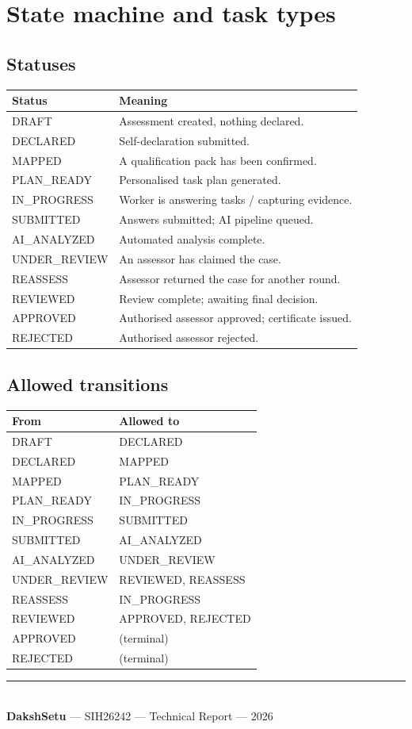 \documentclass[11pt,a4paper]{article}
\begin{document}
\newpage
\section{State machine and task types}
\subsection{Statuses}
\begin{center}
\small
\begin{tabular}{L{3.4cm}L{11.5cm}}
\toprule
\textbf{Status} & \textbf{Meaning} \\
\midrule
DRAFT & Assessment created, nothing declared. \\
DECLARED & Self-declaration submitted. \\
MAPPED & A qualification pack has been confirmed. \\
PLAN\_READY & Personalised task plan generated. \\
IN\_PROGRESS & Worker is answering tasks / capturing evidence. \\
SUBMITTED & Answers submitted; AI pipeline queued. \\
AI\_ANALYZED & Automated analysis complete. \\
UNDER\_REVIEW & An assessor has claimed the case. \\
REASSESS & Assessor returned the case for another round. \\
REVIEWED & Review complete; awaiting final decision. \\
APPROVED & Authorised assessor approved; certificate issued. \\
REJECTED & Authorised assessor rejected. \\
\bottomrule
\end{tabular}
\end{center}

\subsection{Allowed transitions}
\begin{center}
\small
\begin{tabular}{L{3.4cm}L{11.5cm}}
\toprule
\textbf{From} & \textbf{Allowed to} \\
\midrule
DRAFT & DECLARED \\
DECLARED & MAPPED \\
MAPPED & PLAN\_READY \\
PLAN\_READY & IN\_PROGRESS \\
IN\_PROGRESS & SUBMITTED \\
SUBMITTED & AI\_ANALYZED \\
AI\_ANALYZED & UNDER\_REVIEW \\
UNDER\_REVIEW & REVIEWED, REASSESS \\
REASSESS & IN\_PROGRESS \\
REVIEWED & APPROVED, REJECTED \\
APPROVED & (terminal) \\
REJECTED & (terminal) \\
\bottomrule
\end{tabular}
\end{center}

\vfill
\begin{center}
{\color{navy}\rule{\textwidth}{0.8pt}}\\[0.4em]
{\small\color{navy}\textbf{DakshSetu} --- SIH26242 --- Technical Report --- 2026}
\end{center}
\end{document}
